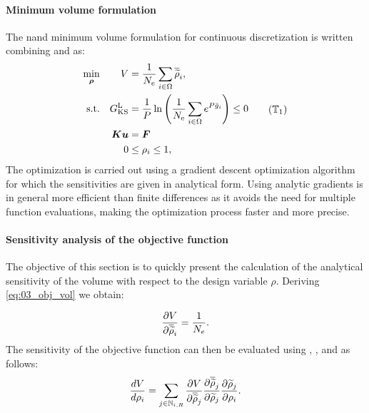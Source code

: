\paragraph{Minimum volume formulation}
The \gls{nand} minimum volume formulation for continuous discretization is written combining  and  as:
\begin{equation}
    \begin{aligned}
    \min_{\bm{\rho}}         && V &= \frac{1}{N_{e}} \sum_{i \in \Omega} \rhophys_i,  \\
    \textrm{s.t.}   && G_{\text{KS}}^\text{L} &= \frac{1}{P} \ln{\left( \frac{1}{N_\text{e}} \sum_{i \in \Omega} e^{{P}\bar{g}_i} \right)} \leq 0 \\
    && \bm{K}\bm{u} &= \bm{F}\\
    && 0 &\leq \rho_i \leq 1, \\
    \end{aligned}
    \tag{$\mathbb{T}_1$}
    \label{eq:03_prob-stress}
\end{equation}
The optimization is carried out using a gradient descent optimization algorithm for which the sensitivities are given in analytical form. Using analytic gradients is in general more efficient than finite differences as it avoids the need for multiple function evaluations, making the optimization process faster and more precise.

\paragraph{Sensitivity analysis of the objective function}
The objective of this section is to quickly present the calculation of the analytical sensitivity of the volume with respect to the design variable $\rho$. Deriving \eqref{eq:03_obj_vol} we obtain:

\begin{equation}
    \frac{\partial V}{\partial\overline{\widetilde{\rho}}_i} = \frac{1}{N_{e}}.
    \label{eq:03_01}
\end{equation}
The sensitivity of the objective function can then be evaluated using  , , and  as follows:
\begin{equation}
    \frac{d V}{d \rho_i} = \sum_{j \in \mathbb{N}_{i,R}} \frac{\partial V}{\partial\overline{\widetilde{\rho}}_j} \frac{\partial\overline{\widetilde{\rho}}_j}{\partial\widetilde{\rho}_j} \frac{\partial\widetilde{\rho}_j}{\partial\rho_i}.
\end{equation}
